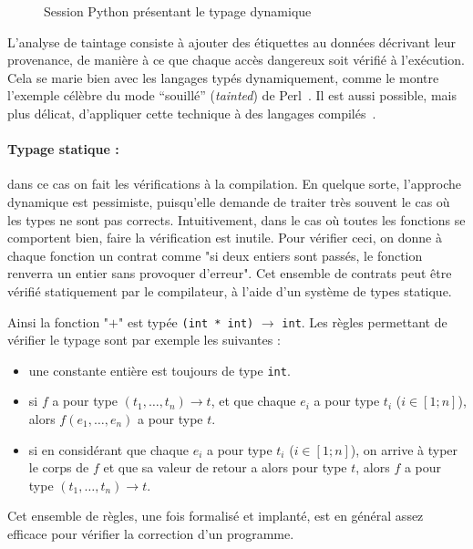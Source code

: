 \begin{figure}
  \caption{Session Python présentant le typage dynamique}
  \label{fig:typage-dynamique}
\end{figure}

L'analyse de taintage consiste à ajouter des étiquettes au données décrivant
leur provenance, de manière à ce que chaque accès dangereux soit vérifié à
l'exécution. Cela se marie bien avec les langages typés dynamiquement, comme le
montre l'exemple célèbre du mode ``souillé'' (\emph{tainted}) de
Perl~\cite{perlCamelBook}. Il est aussi possible, mais plus délicat, d'appliquer
cette technique à des langages compilés~\cite{clause-etal-issta07,oakland10}.

\paragraph{Typage statique :} dans ce cas on fait les vérifications à la
compilation. En quelque sorte, l'approche dynamique est pessimiste, puisqu'elle
demande de traiter très souvent le cas où les types ne sont pas corrects.
Intuitivement, dans le cas où toutes les fonctions se comportent bien, faire la
vérification est inutile. Pour vérifier ceci, on donne à chaque fonction un
contrat comme "si deux entiers sont passés, le fonction renverra un entier sans
provoquer d'erreur". Cet ensemble de contrats peut être vérifié statiquement par
le compilateur, à l'aide d'un système de types statique.


Ainsi la fonction "$+$" est typée \texttt{(int * int)} $→$ \texttt{int}. Les
règles permettant de vérifier le typage sont par exemple les suivantes :

\begin{itemize}
\item
  une constante entière est toujours de type \texttt{int}.
\item
  si $f$ a pour type $(t_1, …, t_n) → t$, et que chaque $e_i$ a pour type $t_i$
  ($i ∈ [1;n]$), alors $f(e_1, …, e_n)$ a pour type $t$.
\item
  si en considérant que chaque $e_i$ a pour type $t_i$ ($i ∈ [1;n]$),
  on arrive à typer le corps de $f$ et que sa valeur de retour a alors
  pour type $t$,
  alors $f$ a pour type $(t_1, …, t_n) → t$.
\end{itemize}

Cet ensemble de règles, une fois formalisé et implanté, est en général assez
efficace pour vérifier la correction d'un programme.

